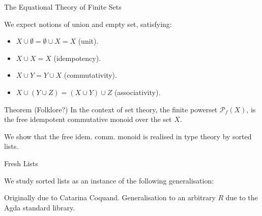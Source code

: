 \documentclass[aspectratio=169]{beamer}
\begin{document}
\begin{frame}{The Equational Theory of Finite Sets}

  We expect notions of union and empty set, satisfying:
\begin{itemize}
  \item $X \cup \emptyset = \emptyset \cup X = X$ (unit).
  \item $X \cup X = X$ (idempotency).
        \smallskip
  \item $X \cup Y = Y \cup X$ (commutativity).
        \smallskip
  \item $X \cup (Y \cup Z) = (X \cup Y) \cup Z$ (associativity).
\end{itemize}


\bigskip

\begin{block}{Theorem (Folklore?)}
  In the context of set theory, the finite powerset $\mathcal{P}_{f}(X)$, is the free idempotent commutative monoid over the set $X$.
\end{block}

\bigskip

We show that the free idem. comm. monoid is realised in type theory by sorted lists.


\end{frame}


\begin{frame}{Fresh Lists}

  We study sorted lists as an instance of the following generalisation:

  \snippetdatafreshlist{}

  Originally due to Catarina Coquand.
  Generalisation to an arbitrary $R$ due to the Agda standard library.
\end{frame}
\end{document}
